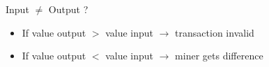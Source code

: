 \documentclass[]{beamer}
\begin{document}
\begin{frame}{Input $\neq$ Output ?}
\begin{itemize}
    \item<1->{If value output $>$ value input $\rightarrow$ transaction invalid}
    \item<2->{If value output $<$ value input $\rightarrow$ miner gets difference}
    \end{itemize} 
    \vspace{2em}
\begin{center}
\end{center}  
\end{frame}
\end{document}
